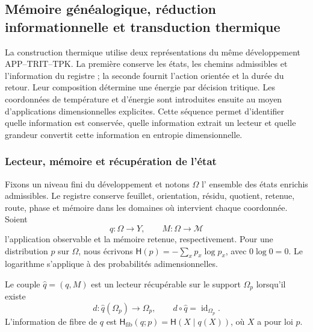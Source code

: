 
\subsection{Mémoire généalogique, réduction informationnelle et transduction thermique}
\label{sec:ii-kb-aut-desarrollo}

La construction thermique utilise deux représentations du même développement
APP--TRIT--TPK. La première conserve les états, les chemins admissibles et
l’information du registre ; la seconde fournit l’action orientée
et la durée du retour. Leur composition détermine une énergie par
décision tritique. Les coordonnées de température et d’énergie sont introduites
ensuite au moyen d’applications dimensionnelles explicites. Cette séquence
permet d’identifier quelle information est conservée, quelle information extrait
un lecteur et quelle grandeur convertit cette information en entropie dimensionnelle.

\subsubsection{Lecteur, mémoire et récupération de l'état}

Fixons un niveau fini du développement et notons \(\Omega\) l'
ensemble des états enrichis admissibles. Le registre conserve feuillet,
orientation, résidu, quotient, retenue, route, phase et mémoire dans les
domaines où intervient chaque coordonnée. Soient
\[
 q:\Omega\longrightarrow Y,\qquad
 M:\Omega\longrightarrow\mathcal M
\]
l’application observable et la mémoire retenue, respectivement. Pour une
distribution \(p\) sur \(\Omega\), nous écrivons
\(\mathsf H(p)=-\sum_xp_x\log p_x\), avec \(0\log0=0\).
Le logarithme s’applique à des probabilités adimensionnelles.

\begin{definition}
Le couple \(\widehat q=(q,M)\) est un lecteur récupérable sur le support
\(\Omega_p\) lorsqu'il existe
\[
 d:\widehat q(\Omega_p)\longrightarrow\Omega_p,
 \qquad d\circ\widehat q=\operatorname{id}_{\Omega_p}.
\]
L'information de fibre de \(q\) est
\(\mathsf H_{\mathrm{fib}}(q;p)=\mathsf H(X\mid q(X))\), où
\(X\) a pour loi \(p\).
\end{definition}

